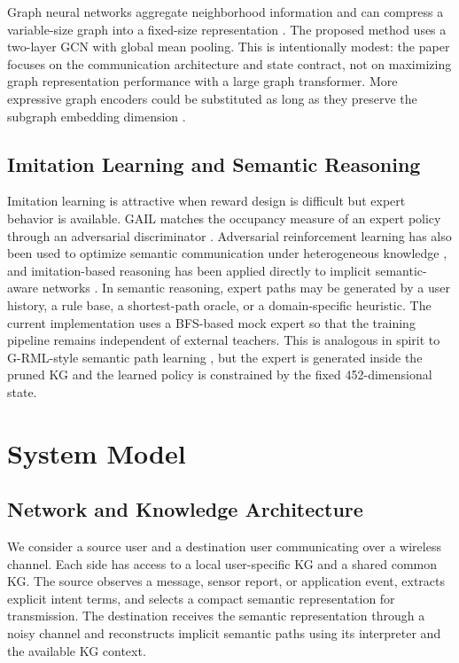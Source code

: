 \documentclass[journal]{IEEEtran}
\begin{document}
Graph neural networks aggregate neighborhood information and can compress a variable-size graph into a fixed-size representation \cite{kipf2017semi}. The proposed method uses a two-layer GCN with global mean pooling. This is intentionally modest: the paper focuses on the communication architecture and state contract, not on maximizing graph representation performance with a large graph transformer. More expressive graph encoders could be substituted as long as they preserve the subgraph embedding dimension \cite{kipf2017semi,liao2026hypergraph}.

\subsection{Imitation Learning and Semantic Reasoning}

Imitation learning is attractive when reward design is difficult but expert behavior is available. GAIL matches the occupancy measure of an expert policy through an adversarial discriminator \cite{ho2016gail}. Adversarial reinforcement learning has also been used to optimize semantic communication under heterogeneous knowledge \cite{zhang2025heteroknowledge}, and imitation-based reasoning has been applied directly to implicit semantic-aware networks \cite{xiao2023imitation}. In semantic reasoning, expert paths may be generated by a user history, a rule base, a shortest-path oracle, or a domain-specific heuristic. The current implementation uses a BFS-based mock expert so that the training pipeline remains independent of external teachers. This is analogous in spirit to G-RML-style semantic path learning \cite{xiao2024reasoning}, but the expert is generated inside the pruned KG and the learned policy is constrained by the fixed 452-dimensional state.

\section{System Model}

\subsection{Network and Knowledge Architecture}

We consider a source user and a destination user communicating over a wireless channel. Each side has access to a local user-specific KG and a shared common KG. The source observes a message, sensor report, or application event, extracts explicit intent terms, and selects a compact semantic representation for transmission. The destination receives the semantic representation through a noisy channel and reconstructs implicit semantic paths using its interpreter and the available KG context.
\end{document}
